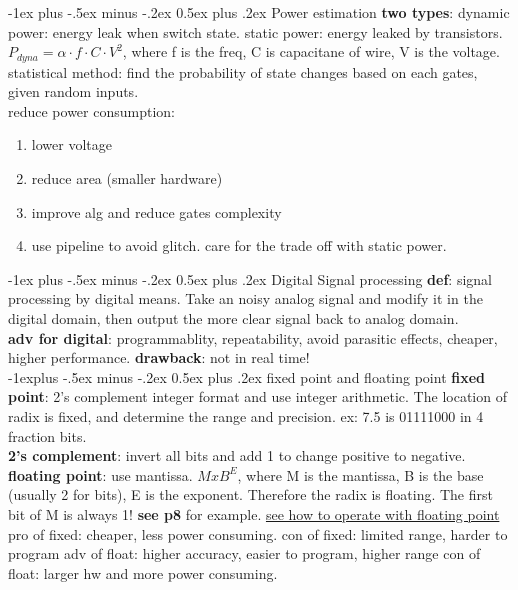 \documentclass[10pt,landscape]{article}
\makeatletter
\renewcommand{\section}{\@startsection{section}{1}{0mm}%
                                {-1ex plus -.5ex minus -.2ex}%
                                {0.5ex plus .2ex}%
                                {\normalfont\large\bfseries}}
\renewcommand{\subsection}{\@startsection{subsection}{2}{0mm}%
                                {-1explus -.5ex minus -.2ex}%
                                {0.5ex plus .2ex}%
                                {\normalfont\normalsize\bfseries}}
\theoremstyle{definition}
\makeatother
\begin{document}
\begin{multicols}{3}
\section{Power estimation}
\textbf{two types}: dynamic power: energy leak when switch state. static power: energy leaked by transistors. \\
$P_{dyna} = \alpha \cdot f \cdot C \cdot V^2$, where f is the freq, C is capacitane of wire, V is the voltage. \\
statistical method: find the probability of state changes based on each gates, given random inputs. \\
reduce power consumption: 
\begin{enumerate}
    \item lower voltage
    \item reduce area (smaller hardware)
    \item improve alg and reduce gates complexity
    \item use pipeline to avoid glitch. care for the trade off with static power. 
\end{enumerate}

\section{Digital Signal processing}
\textbf{def}: signal processing by digital means. Take an noisy analog signal and modify it in the digital domain, then output the more clear signal back to analog domain. \\
\textbf{adv for digital}: programmablity, repeatability, avoid parasitic effects, cheaper, higher performance. \textbf{drawback}: not in real time! \\

\subsection{fixed point and floating point}
\textbf{fixed point}: 2's complement integer format and use integer arithmetic. The location of radix is fixed, and determine the range and precision. ex: 7.5 is 01111000 in 4 fraction bits. \\
\textbf{2's complement}: invert all bits and add 1 to change positive to negative. 
\textbf{floating point}: use mantissa. $M x B^E$, where M is the mantissa, B is the base (usually 2 for bits), E is the exponent. Therefore the radix is floating. The first bit of M is always 1! \textbf{see p8} for example.  \href{https://drive.google.com/file/d/0By2-dmbuBCMTck1LUnp6Nzd2YW8/view}{see how to operate with floating point} \\
pro of fixed: cheaper, less power consuming. 
con of fixed: limited range, harder to program
adv of float: higher accuracy, easier to program, higher range
con of float: larger hw and more power consuming. 



\end{multicols}
\end{document}
